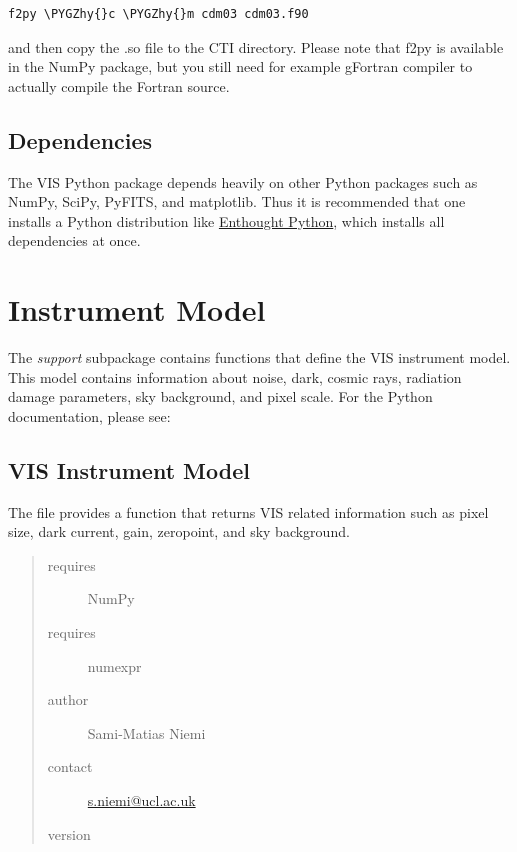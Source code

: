 \documentclass[a4paper,11pt,english]{sphinxmanual}
\def\PYGZhy{\char`\-}
\begin{document}
\begin{Verbatim}[commandchars=\\\{\}]
f2py \PYGZhy{}c \PYGZhy{}m cdm03 cdm03.f90
\end{Verbatim}

and then copy the .so file to the CTI directory. Please note that f2py is available in the NumPy package,
but you still need for example gFortran compiler to actually compile the Fortran source.


\section{Dependencies}
\label{index:dependencies}
The VIS Python package depends heavily on other Python packages such as NumPy, SciPy, PyFITS, and matplotlib.
Thus it is recommended that one installs a Python distribution like \href{http://www.enthought.com/}{Enthought Python},
which installs all dependencies at once.


\chapter{Instrument Model}
\label{index:instrument-model}
The \emph{support} subpackage contains functions that define the VIS instrument model. This model contains information
about noise, dark, cosmic rays, radiation damage parameters, sky background, and pixel scale. For the Python
documentation, please see:
\label{instrument:module-support.VISinstrumentModel}

\section{VIS Instrument Model}
\label{instrument:vis-instrument-model}\label{instrument::doc}
The file provides a function that returns VIS related information such as pixel
size, dark current, gain, zeropoint, and sky background.
\begin{quote}\begin{description}
\item[{requires}] \leavevmode
NumPy

\item[{requires}] \leavevmode
numexpr

\item[{author}] \leavevmode
Sami-Matias Niemi

\item[{contact}] \leavevmode
\href{mailto:s.niemi@ucl.ac.uk}{s.niemi@ucl.ac.uk}

\item[{version}] 

\end{description}\end{quote}
\end{document}
